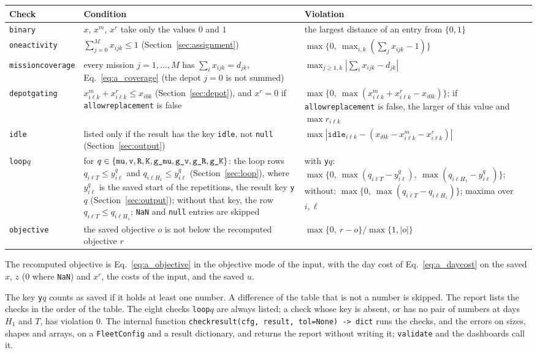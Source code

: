 \documentclass[11pt,a4paper]{article}
\makeatletter
\theoremstyle{plain}
\theoremstyle{definition}
\renewcommand{\_}{\textunderscore\allowbreak{}}
\providecommand{\typerow}[3]{{\raggedright #1\par} & {\raggedright #2\par} & {\raggedright #3\par} \\}
\providecommand{\tabstart}[2]{\begingroup\small\begin{longtable}{@{}#1@{}}\toprule #2 \\ \midrule \endhead}
\providecommand{\tabend}{\bottomrule\end{longtable}\endgroup}
\makeatother
\begin{document}
\tabstart{p{2.6cm}p{7.2cm}p{5.2cm}}{Check & Condition & Violation}
\typerow{\texttt{binary}}{$x$, $x^m$, $x^r$ take only the values $0$ and $1$}{the largest distance of an entry from $\{0,1\}$}
\typerow{\texttt{one\_activity}}{$\sum_{j=0}^{M} x_{ijk} \leq 1$ (Section~\ref{sec:assignment})}{$\max\{0,\ \max_{i,k}(\sum_j x_{ijk} - 1)\}$}
\typerow{\texttt{mission\_coverage}}{every mission $j = 1,\ldots,M$ has $\sum_{i} x_{ijk} = d_{jk}$, Eq.~\eqref{eq:a_coverage} (the depot $j = 0$ is not summed)}{$\max_{j \geq 1,k} |\sum_i x_{ijk} - d_{jk}|$}
\typerow{\texttt{depot\_gating}}{$x^m_{i\ell k} + x^r_{i\ell k} \leq x_{i0k}$ (Section~\ref{sec:depot}), and $x^r = 0$ if \texttt{allow\_replacement} is false}{$\max\{0,\ \max(x^m_{i\ell k} + x^r_{i\ell k} - x_{i0k})\}$; if \texttt{allow\_replacement} is false, the larger of this value and $\max r_{i\ell k}$}
\typerow{\texttt{idle}}{listed only if the result has the key \texttt{idle}, not \texttt{null} (Section~\ref{sec:output})}{$\max |\texttt{idle}_{i\ell k} - (x_{i0k} - x^m_{i\ell k} - x^r_{i\ell k})|$}
\typerow{\texttt{loop\_}$q$}{for $q \in \{\texttt{mu}, \texttt{v}, \texttt{R}, \texttt{K}, \texttt{g\_mu}, \texttt{g\_v}, \texttt{g\_R}, \texttt{g\_K}\}$: the loop rows $q_{i\ell T} \leq y^q_{i\ell}$ and $q_{i\ell H_1} \leq y^q_{i\ell}$ (Section~\ref{sec:loop}), where $y^q_{i\ell}$ is the saved start of the repetitions, the result key \texttt{y\_}$q$ (Section~\ref{sec:output}); without that key, the row $q_{i\ell T} \leq q_{i\ell H_1}$; \texttt{NaN} and \texttt{null} entries are skipped}{with \texttt{y\_}$q$: $\max\{0,\ \max(q_{i\ell T} - y^q_{i\ell}),\ \max(q_{i\ell H_1} - y^q_{i\ell})\}$; without: $\max\{0,\ \max(q_{i\ell T} - q_{i\ell H_1})\}$; maxima over $i,\ell$}
\typerow{\texttt{objective}}{the saved objective $o$ is not below the recomputed objective $r$}{$\max\{0,\ r - o\}/\max\{1, |o|\}$}
\tabend

The recomputed objective is Eq.~\eqref{eq:a_objective} in the objective mode of the input, with the day cost of Eq.~\eqref{eq:a_daycost} on the saved $x$, $z$ ($0$ where \texttt{NaN}) and $x^r$, the costs of the input, and the saved $u$.

The key \texttt{y\_}$q$ counts as saved if it holds at least one number. A difference of the table that is not a number is skipped. The report lists the checks in the order of the table. The eight checks \texttt{loop\_}$q$ are always listed; a check whose key is absent, or has no pair of numbers at days $H_1$ and $T$, has violation $0$. The internal function \texttt{check\_result(cfg, result, tol=None) -> dict} runs the checks, and the errors on sizes, shapes and arrays, on a \texttt{FleetConfig} and a result dictionary, and returns the report without writing it; \texttt{validate} and the dashboards call it.
\end{document}
